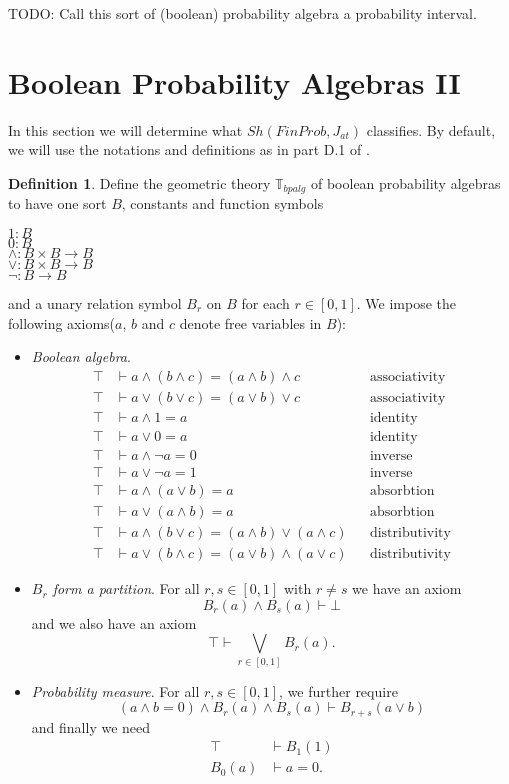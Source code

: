 \documentclass[a4paper]{amsproc}
\theoremstyle{plain}
\theoremstyle{definition}
\newtheorem{definition}{Definition}[section]
\theoremstyle{remark}
\numberwithin{equation}{section}
\begin{document}
TODO: Call this sort of (boolean) probability algebra a probability interval.

\section{Boolean Probability Algebras II}

In this section we will determine what $Sh(FinProb, J_{at})$ classifies. By default, we will use the notations and definitions as in part D.1 of \cite{elephant}.

\begin{definition}
Define the geometric theory $\mathbb{T}_{bpalg}$ of boolean probability algebras to have one sort $B$, constants and function symbols
\begin{center}
$1: B$ \\
$0: B$ \\
$\wedge: B \times B \to B$ \\
$\vee: B \times B \to B$ \\
$\neg: B \to B$
\end{center}
and a unary relation symbol $B_r$ on $B$ for each $r \in [0,1]$. We impose the following axioms($a$, $b$ and $c$ denote free variables in $B$):
\begin{itemize}
\item \textit{Boolean algebra}.
\begin{align*}
\top &\vdash a \wedge (b \wedge c) = (a \wedge b) \wedge c && \text{associativity} \\
\top &\vdash a \vee (b \vee c) = (a \vee b) \vee c && \text{associativity} \\
\top &\vdash a \wedge 1 = a && \text{identity} \\
\top &\vdash a \vee 0 = a && \text{identity}\\
\top &\vdash a \wedge \neg{a} = 0 && \text{inverse}\\
\top &\vdash a \vee \neg{a} = 1 && \text{inverse}\\
\top &\vdash a \wedge (a \vee b) = a && \text{absorbtion}\\
\top &\vdash a \vee (a \wedge b) = a && \text{absorbtion}\\
\top &\vdash a \wedge (b \vee c) = (a \wedge b) \vee (a \wedge c) && \text{distributivity} \\
\top &\vdash a \vee (b \wedge c) = (a \vee b) \wedge (a \vee c) && \text{distributivity}
\end{align*}
\item \textit{$B_r$ form a partition}. For all $r, s \in [0,1]$ with $r \neq s$ we have an axiom
\[
B_r(a)  \wedge B_s(a) \vdash \bot
\]
and we also have an axiom
\[
\top \vdash \bigvee_{r \in [0,1]} B_r(a).
\]
\item \textit{Probability measure}. For all $r, s \in [0,1]$, we further require
\[
(a \wedge b = 0) \wedge B_r(a) \wedge B_s(a) \vdash B_{r+s}(a \vee b) 
\]
and finally we need
\begin{align*}
\top & \vdash B_1(1) \\
B_0(a) & \vdash a = 0.
\end{align*}
\end{itemize}
\end{definition}
\end{document}

